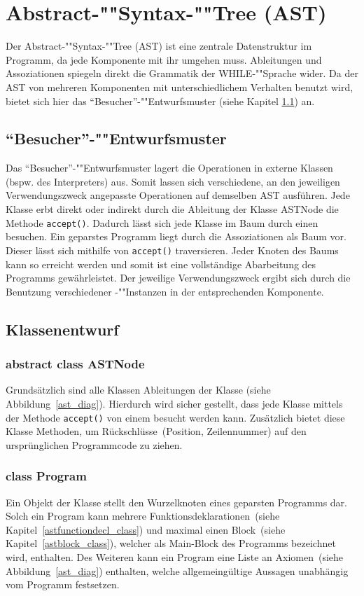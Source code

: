 \section{Abstract-""Syntax-""Tree (AST)}

Der Abstract-""Syntax-""Tree (AST) ist eine zentrale Datenstruktur im Programm, da jede Komponente mit ihr umgehen muss. Ableitungen und Assoziationen spiegeln direkt die Grammatik der WHILE-""Sprache wider. Da der AST von mehreren Komponenten mit unterschiedlichem Verhalten benutzt wird, bietet sich hier das "`Besucher"'-""Entwurfsmuster (siehe Kapitel \ref{astvisitor_sec}) an.

\subsection{"`Besucher"'-""Entwurfsmuster}
\label{astvisitor_sec}
Das "`Besucher"'-""Entwurfsmuster lagert die Operationen in externe Klassen (bspw. des Interpreters) aus. Somit lassen sich verschiedene, an den jeweiligen Verwendungszweck angepasste Operationen auf demselben AST ausführen. Jede Klasse erbt direkt oder indirekt durch die Ableitung der Klasse ASTNode die Methode \texttt{accept()}. Dadurch lässt sich jede Klasse im Baum durch einen  besuchen.
Ein geparstes Programm liegt durch die Assoziationen als Baum vor. Dieser lässt sich mithilfe von \texttt{accept()} traversieren. Jeder Knoten des Baums kann so erreicht werden und somit ist eine vollständige Abarbeitung des Programms gewährleistet. Der jeweilige Verwendungszweck ergibt sich durch die Benutzung verschiedener -""Instanzen in der entsprechenden Komponente. 

\subsection{Klassenentwurf}
\subsubsection{abstract class ASTNode}
\label{astnode_class}
Grundsätzlich sind alle Klassen Ableitungen der Klasse  (siehe Abbildung~\ref{ast_diag}). Hierdurch wird sicher gestellt, dass jede Klasse mittels der Methode \texttt{accept()} von einem  besucht werden kann. Zusätzlich bietet diese Klasse Methoden, um Rückschlüsse~(Position, Zeilennummer) auf den ursprünglichen Programmcode zu ziehen.

\subsubsection{class Program}
Ein Objekt der Klasse  stellt den Wurzelknoten eines geparsten Programms dar. Solch ein Program kann mehrere Funktionsdeklarationen~(siehe Kapitel~\ref{astfunctiondecl_class}) und maximal einen Block~(siehe Kapitel~\ref{astblock_class}), welcher als Main-Block des Programms bezeichnet wird, enthalten. Des Weiteren kann ein Program eine Liste an Axiomen~(siehe Abbildung~\ref{ast_diag}) enthalten, welche allgemeingültige Aussagen unabhängig vom Programm festsetzen.

